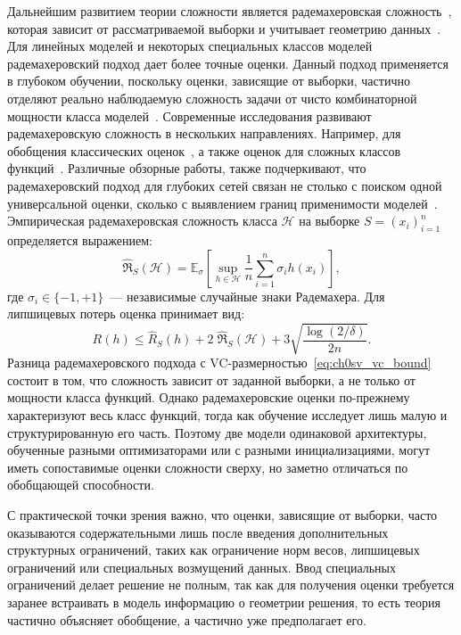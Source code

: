 Дальнейшим развитием теории сложности является радемахеровская сложность~\cite{koltchinskii2000RadamakherTheory,bartlett2002rademacher}, которая зависит от рассматриваемой выборки и учитывает геометрию данных~\cite{truong2022rademacher,algorithmicRademacher2023}.
Для линейных моделей и некоторых специальных классов моделей радемахеровский подход дает более точные оценки.
Данный подход применяется в глубоком обучении, поскольку оценки, зависящие от выборки, частично отделяют реально наблюдаемую сложность задачи от чисто комбинаторной мощности класса моделей~\cite{truong2022rademacher,algorithmicRademacher2023}.
Современные исследования развивают радемахеровскую сложность в нескольких направлениях. Например, для обобщения классических оценок~\cite{bartlett1996vcreal}, а также оценок для сложных классов функций~\cite{vapnik1999vccontrol}.
Различные обзорные работы, также подчеркивают, что радемахеровский подход для глубоких сетей связан не столько с поиском одной универсальной оценки, сколько с выявлением границ применимости моделей~\cite{golowich2016lessons,valleperez2020bounds}.
Эмпирическая радемахеровская сложность класса $\mathcal H$ на выборке $S=(x_i)_{i=1}^n$ определяется выражением:
\begin{equation}
\hat{\mathfrak R}_S(\mathcal H)=
\mathbb E_{\sigma}\!\left[\sup_{h\in\mathcal H}\frac{1}{n}\sum_{i=1}^n \sigma_i h(x_i)\right],
\label{eq:ch0sv_rademacher_def}
\end{equation}
где $\sigma_i\in\{-1,+1\}$~--- независимые случайные знаки Радемахера. Для липшицевых потерь оценка принимает вид:
\begin{equation}
R(h)\le \hat R_S(h)+2\;\hat{\mathfrak R}_S(\mathcal H)+3\sqrt{\frac{\log(2/\delta)}{2n}}.
\label{eq:ch0sv_rademacher_bound}
\end{equation}
Разница радемахеровского подхода с VC-размерностью~\eqref{eq:ch0sv_vc_bound} состоит в том, что сложность зависит от заданной выборки, а не только от мощности класса функций.
Однако радемахеровские оценки по-прежнему характеризуют весь класс функций, тогда как обучение исследует лишь малую и структурированную его часть.
Поэтому две модели одинаковой архитектуры, обученные разными оптимизаторами или с разными инициализациями, могут иметь сопоставимые оценки сложности сверху, но заметно отличаться по обобщающей способности.

С практической точки зрения важно, что оценки, зависящие от выборки, часто оказываются содержательными лишь после введения дополнительных структурных ограничений, таких как ограничение норм весов, липшицевых ограничений или специальных возмущений данных.
Ввод специальных ограничений делает решение не полным, так как для получения оценки требуется заранее встраивать в модель информацию о геометрии решения, то есть теория частично объясняет обобщение, а частично уже предполагает его.

